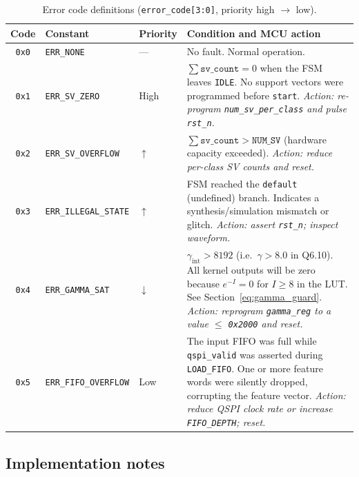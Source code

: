 \documentclass[11pt,a4paper]{article}
\begin{document}
\begin{table}[h]
\centering
\caption{Error code definitions (\texttt{error\_code[3:0]}, priority
         high $\to$ low).}
\label{tab:errcodes}
\begin{tabular}{cllp{5.8cm}}
\toprule
Code & Constant & Priority & Condition and MCU action \\
\midrule
\texttt{0x0} & \texttt{ERR\_NONE}          & ---    &
  No fault.  Normal operation. \\[3pt]
\texttt{0x1} & \texttt{ERR\_SV\_ZERO}      & High   &
  $\sum\texttt{sv\_count} = 0$ when the FSM leaves \texttt{IDLE}.
  No support vectors were programmed before \texttt{start}.
  \emph{Action: re-program \texttt{num\_sv\_per\_class} and pulse \texttt{rst\_n}.} \\[3pt]
\texttt{0x2} & \texttt{ERR\_SV\_OVERFLOW}  & $\uparrow$ &
  $\sum\texttt{sv\_count} > \texttt{NUM\_SV}$ (hardware capacity exceeded).
  \emph{Action: reduce per-class SV counts and reset.} \\[3pt]
\texttt{0x3} & \texttt{ERR\_ILLEGAL\_STATE}& $\uparrow$ &
  FSM reached the \texttt{default} (undefined) branch.  Indicates a
  synthesis/simulation mismatch or glitch.
  \emph{Action: assert \texttt{rst\_n}; inspect waveform.} \\[3pt]
\texttt{0x4} & \texttt{ERR\_GAMMA\_SAT}    & $\downarrow$ &
  $\gamma_\text{int} > 8192$ (i.e.\ $\gamma > 8.0$ in Q6.10).
  All kernel outputs will be zero because $e^{-I} = 0$ for $I \geq 8$
  in the LUT.  See Section~\ref{eq:gamma_guard}.
  \emph{Action: reprogram \texttt{gamma\_reg} to a value $\leq$ \texttt{0x2000} and reset.} \\[3pt]
\texttt{0x5} & \texttt{ERR\_FIFO\_OVERFLOW}& Low    &
  The input FIFO was full while \texttt{qspi\_valid} was asserted during
  \texttt{LOAD\_FIFO}.  One or more feature words were silently dropped,
  corrupting the feature vector.
  \emph{Action: reduce QSPI clock rate or increase \texttt{FIFO\_DEPTH}; reset.} \\
\bottomrule
\end{tabular}
\end{table}

\subsection*{Implementation notes}
\end{document}
